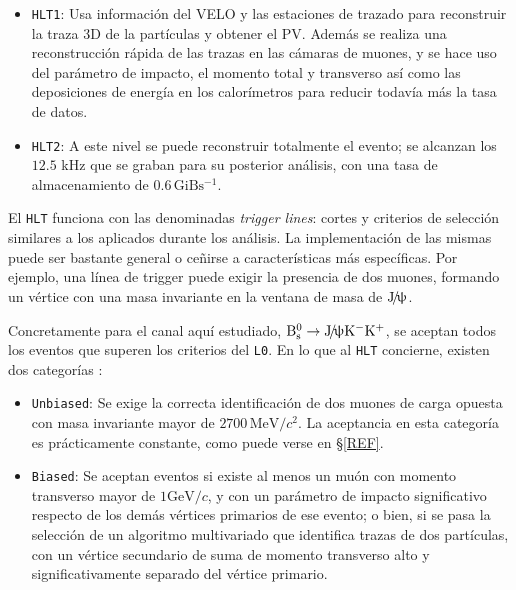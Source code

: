 \begin{itemize}
  \item \texttt{HLT1}: Usa información del VELO y las estaciones de trazado para reconstruir la traza 3D de la partículas y obtener el PV. Además se realiza una reconstrucción rápida de las trazas en las cámaras de muones, y se hace uso del parámetro de impacto, el momento total y transverso así como las deposiciones de energía en los calorímetros para reducir todavía más la tasa de datos.
  \item \texttt{HLT2}: A este nivel se puede reconstruir  totalmente el evento; se alcanzan los $12.5$ kHz que se graban para su posterior análisis, con una tasa de almacenamiento de $0.6 \, \mathrm{GiB s^{-1}}$.
\end{itemize}

\color{dieg}
El \texttt{HLT} funciona con las denominadas \emph{trigger lines}: cortes y criterios de selección similares a los aplicados durante los análisis. La implementación de las mismas puede ser bastante general o ceñirse a características más específicas. Por ejemplo, una línea de trigger puede exigir la presencia de dos muones, formando un vértice con una masa invariante en la ventana de masa de $\text{J}\!/\!\uppsi$. \color{norm}

 

Concretamente para el canal aquí estudiado, $\text{B}{}_{\text{s}}^{0} \to \text{J}\!/\!\uppsi \text{K}{}^{-} \text{K}{}^{+}$, se aceptan todos los eventos que superen los criterios del \texttt{L0}. En  lo que al \texttt{HLT} concierne, existen dos categorías \cite{paperPhis}:
\begin{itemize}
  \item \texttt{Unbiased}: Se exige la correcta identificación de dos muones de carga opuesta con masa invariante mayor de $2700 \,\mathrm{MeV/}c^2$. La aceptancia en esta categoría es prácticamente constante, como puede verse en \S \ref{REF}.
  \item \texttt{Biased}: Se aceptan eventos si existe al menos un muón con momento transverso mayor de $1 \mathrm{GeV/}c$, y con un parámetro de impacto significativo respecto de los demás vértices primarios de ese evento; o bien, si se pasa la selección de un algoritmo multivariado que  identifica trazas de dos partículas, con un vértice secundario de suma de momento transverso alto y significativamente separado del vértice primario.
\end{itemize}




